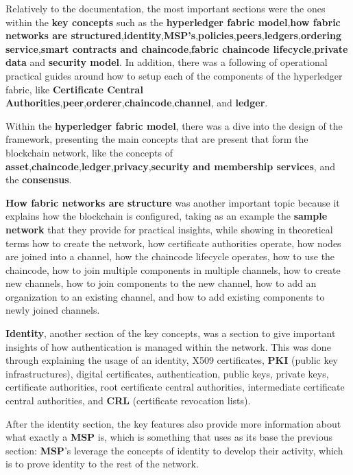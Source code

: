 Relatively to the documentation, the most important sections were the ones within the \textbf{key concepts} such as the \textbf{hyperledger fabric model},\textbf{how fabric networks are structured},\textbf{identity},\textbf{MSP's},\textbf{policies},\textbf{peers},\textbf{ledgers},\textbf{ordering service},\textbf{smart contracts and chaincode},\textbf{fabric chaincode lifecycle},\textbf{private data} and \textbf{security model}. In addition, there was a following of operational practical guides around how to setup each of the components of the hyperledger fabric, like \textbf{Certificate Central Authorities},\textbf{peer},\textbf{orderer},\textbf{chaincode},\textbf{channel}, and \textbf{ledger}.

Within the \textbf{hyperledger fabric model}, there was a dive into the design of the framework, presenting the main concepts that are present that form the blockchain network, like the concepts of \textbf{asset},\textbf{chaincode},\textbf{ledger},\textbf{privacy},\textbf{security and membership services}, and the \textbf{consensus}.

\textbf{How fabric networks are structure} was another important topic because it explains how the blockchain is configured, taking as an example the \textbf{sample network} that they provide for practical insights, while showing in theoretical terms how to create the network, how certificate authorities operate, how nodes are joined into a channel, how the chaincode lifecycle operates, how to use the chaincode, how to join multiple components in multiple channels, how to create new channels, how to join components to the new channel, how to add an organization to an existing channel, and how to add existing components to newly joined channels.

\textbf {Identity}, another section of the key concepts, was a section to give important insights of how authentication is managed within the network. This was done through explaining the usage of an identity, X509 certificates, \textbf{PKI} (public key infrastructures), digital certificates, authentication, public keys, private keys, certificate authorities, root certificate central authorities, intermediate certificate central authorities, and \textbf{CRL} (certificate revocation lists).

After the identity section, the key features also provide more information about what exactly a \textbf{MSP} is, which is something that uses as its base the previous section: \textbf{MSP}'s leverage the concepts of identity to develop their activity, which is to prove identity to the rest of the network.

